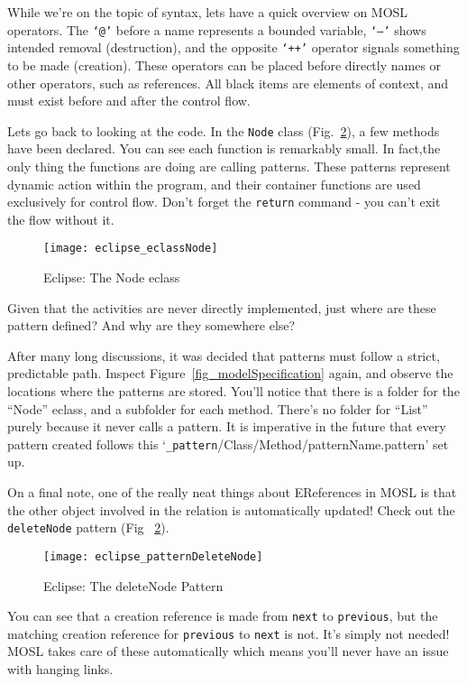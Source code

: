 While we're on the topic of syntax, lets have a quick overview on MOSL operators. The \texttt{`@'} before a name represents a bounded variable, \texttt{`--'} shows intended removal (destruction), and the opposite \texttt{`++'} operator signals something to be made (creation). These operators can be placed before directly names or other operators, such as references.  All black items are elements of context, and must exist before and after the control flow. 

Lets go back to looking at the code. In the \texttt{Node} class (Fig.~\ref{fig_patternDeleteNode}), a few methods have been declared. You can see each function is remarkably small. In fact,the only thing the functions are doing are calling patterns. These patterns represent dynamic action within the program, and their container functions are used exclusively for control flow. Don't forget the \texttt{return} command - you can't exit the flow without it. 

 \begin{figure}[htbp]
  \centering
  \texttt{[image: eclipse\_eclassNode]}
  \caption{Eclipse: The Node eclass}
  \label{fig_eclassNode}
\end{figure}

Given that the activities are never directly implemented, just where are these pattern defined? And why are they somewhere else? 

After many long discussions, it was decided that patterns must follow a strict, predictable path. Inspect Figure~\ref{fig_modelSpecification} again, and observe the locations where the patterns are stored. You'll notice that there is a folder for the ``Node'' eclass, and a subfolder for each method. There's no folder for ``List'' purely because it never calls a pattern. It is imperative in the future that every pattern created follows this `\texttt{\_pattern}/Class/Method/patternName.pattern' set up.

On a final note, one of the really neat things about EReferences in MOSL is that the other object involved in the relation is automatically updated! Check out the \texttt{deleteNode} pattern (Fig ~\ref{fig_patternDeleteNode}). 

 \begin{figure}[htbp]
  \centering
  \texttt{[image: eclipse\_patternDeleteNode]}
  \caption{Eclipse: The deleteNode Pattern}
  \label{fig_patternDeleteNode}
\end{figure}

You can see that a creation reference is made from \texttt{next} to \texttt{previous}, but the matching creation reference for \texttt{previous} to \texttt{next} is not. It's simply not needed! MOSL takes care of these automatically which means you'll never have an issue with hanging links. 


